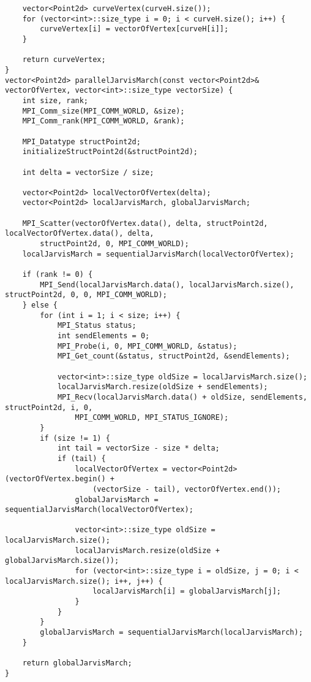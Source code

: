 \documentclass{report}
\begin{document}
\begin{lstlisting}
    vector<Point2d> curveVertex(curveH.size());
    for (vector<int>::size_type i = 0; i < curveH.size(); i++) {
        curveVertex[i] = vectorOfVertex[curveH[i]];
    }

    return curveVertex;
}
vector<Point2d> parallelJarvisMarch(const vector<Point2d>& vectorOfVertex, vector<int>::size_type vectorSize) {
    int size, rank;
    MPI_Comm_size(MPI_COMM_WORLD, &size);
    MPI_Comm_rank(MPI_COMM_WORLD, &rank);

    MPI_Datatype structPoint2d;
    initializeStructPoint2d(&structPoint2d);

    int delta = vectorSize / size;

    vector<Point2d> localVectorOfVertex(delta);
    vector<Point2d> localJarvisMarch, globalJarvisMarch;

    MPI_Scatter(vectorOfVertex.data(), delta, structPoint2d, localVectorOfVertex.data(), delta,
        structPoint2d, 0, MPI_COMM_WORLD);
    localJarvisMarch = sequentialJarvisMarch(localVectorOfVertex);

    if (rank != 0) {
        MPI_Send(localJarvisMarch.data(), localJarvisMarch.size(), structPoint2d, 0, 0, MPI_COMM_WORLD);
    } else {
        for (int i = 1; i < size; i++) {
            MPI_Status status;
            int sendElements = 0;
            MPI_Probe(i, 0, MPI_COMM_WORLD, &status);
            MPI_Get_count(&status, structPoint2d, &sendElements);

            vector<int>::size_type oldSize = localJarvisMarch.size();
            localJarvisMarch.resize(oldSize + sendElements);
            MPI_Recv(localJarvisMarch.data() + oldSize, sendElements, structPoint2d, i, 0,
                MPI_COMM_WORLD, MPI_STATUS_IGNORE);
        }
        if (size != 1) {
            int tail = vectorSize - size * delta;
            if (tail) {
                localVectorOfVertex = vector<Point2d>(vectorOfVertex.begin() +
                    (vectorSize - tail), vectorOfVertex.end());
                globalJarvisMarch = sequentialJarvisMarch(localVectorOfVertex);

                vector<int>::size_type oldSize = localJarvisMarch.size();
                localJarvisMarch.resize(oldSize + globalJarvisMarch.size());
                for (vector<int>::size_type i = oldSize, j = 0; i < localJarvisMarch.size(); i++, j++) {
                    localJarvisMarch[i] = globalJarvisMarch[j];
                }
            }
        }
        globalJarvisMarch = sequentialJarvisMarch(localJarvisMarch);
    }

    return globalJarvisMarch;
}
\end{lstlisting}
\end{document}
